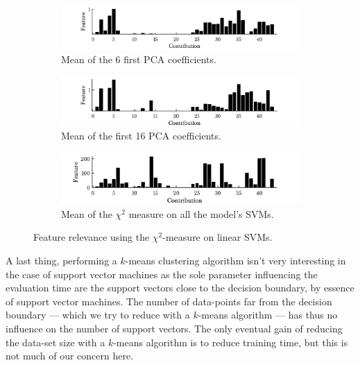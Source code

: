 \begin{figure}[h!]
        \begin{subfigure}[b]{1\textwidth}  
            \centering 
            \includegraphics[width=.98\textwidth]{parts/chap-4/img-svm/pca-features-3.png}
            \caption{Mean of the 6 first PCA coefficients.} 
        \end{subfigure}
        \vfill
        \begin{subfigure}[b]{1\textwidth}   
            \centering 
            \includegraphics[width=.98\textwidth]{parts/chap-4/img-svm/pca-features-3-bis.png}
            \caption{Mean of the first 16 PCA coefficients.} 
        \end{subfigure}
        \vfill
        \begin{subfigure}[b]{1\textwidth}   
            \centering 
            \includegraphics[width=.98\textwidth]{parts/chap-4/img-svm/chi2-features.png}
            \caption{Mean of the $\chi^2$ measure on all the model's SVMs.} 
        \end{subfigure}
        \caption[Feature relevance using the $\chi^2$-measure on linear SVMs.]{Feature relevance using the $\chi^2$-measure on linear SVMs.}
        \label{fig:features-part}
\end{figure}

A last thing, performing a $k$-means clustering algorithm isn't very interesting in the case of support vector machines as the sole parameter influencing the evaluation time are the support vectors close to the decision boundary, by essence of support vector machines. The number of data-points far from the decision boundary --- which we try to reduce with a $k$-means algorithm --- has thus no influence on the number of support vectors. The only eventual gain of reducing the data-set size with a $k$-means algorithm is to reduce training time, but this is not much of our concern here.


